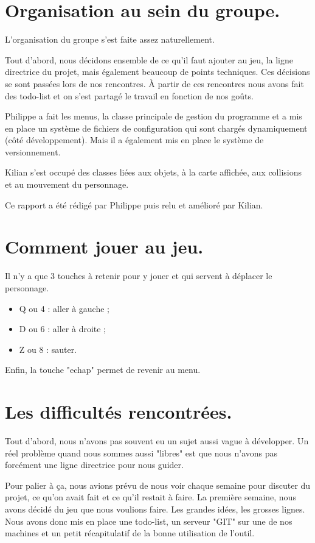 \section{Organisation au sein du groupe.}

L'organisation du groupe s'est faite assez naturellement.

Tout d'abord, nous décidons ensemble de ce qu'il faut ajouter au jeu, 
la ligne directrice du projet, mais également beaucoup de points techniques.
Ces décisions se sont passées lors de nos rencontres.
À partir de ces rencontres nous avons fait des todo-list et on s'est partagé le travail en fonction de nos goûts.

Philippe a fait les menus, la classe principale de gestion du programme et a mis en place un système de fichiers de configuration qui sont chargés dynamiquement (côté développement).
Mais il a également mis en place le système de versionnement.

Kilian s'est occupé des classes liées aux objets, à la carte affichée, aux collisions et au mouvement du personnage.

Ce rapport a été rédigé par Philippe puis relu et amélioré par Kilian.

\section{Comment jouer au jeu.}

Il n'y a que 3 touches à retenir pour y jouer et qui servent à déplacer le personnage.

\begin{itemize}
	\item Q ou 4 : aller à gauche ;
	\item D ou 6 : aller à droite ;
	\item Z ou 8 : sauter.
\end{itemize}

Enfin, la touche "echap" permet de revenir au menu.

\section{Les difficultés rencontrées.}

Tout d'abord, nous n'avons pas souvent eu un sujet aussi vague à développer.
Un réel problème quand nous sommes aussi "libres" est que nous n'avons pas forcément une ligne directrice pour nous guider.

Pour palier à ça, nous avions prévu de nous voir chaque semaine pour discuter du projet, ce qu'on avait fait et ce qu'il restait à faire.
La première semaine, nous avons décidé du jeu que nous voulions faire.
Les grandes idées, les grosses lignes.
Nous avons donc mis en place une todo-list, un serveur "GIT" sur une de nos machines et un petit récapitulatif de la bonne utilisation de l'outil.


